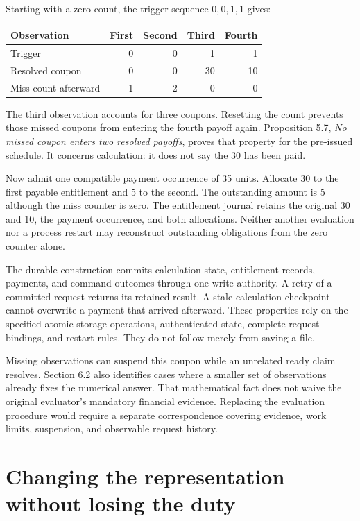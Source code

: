 \documentclass{momentum}
\begin{document}
Starting with a zero count, the trigger sequence $0,0,1,1$ gives:

\begin{center}
\begin{tabular}{@{}lrrrr@{}}
\toprule
Observation & First & Second & Third & Fourth \\
\midrule
Trigger & 0 & 0 & 1 & 1 \\
Resolved coupon & 0 & 0 & 30 & 10 \\
Miss count afterward & 1 & 2 & 0 & 0 \\
\bottomrule
\end{tabular}
\end{center}

The third observation accounts for three coupons. Resetting the count prevents those missed coupons from entering the fourth payoff again. Proposition 5.7, \emph{No missed coupon enters two resolved payoffs}, proves that property for the pre-issued schedule. It concerns calculation: it does not say the 30 has been paid.

Now admit one compatible payment occurrence of 35 units. Allocate 30 to the first payable entitlement and 5 to the second. The outstanding amount is 5 although the miss counter is zero. The entitlement journal retains the original 30 and 10, the payment occurrence, and both allocations. Neither another evaluation nor a process restart may reconstruct outstanding obligations from the zero counter alone.

The durable construction commits calculation state, entitlement records, payments, and command outcomes through one write authority. A retry of a committed request returns its retained result. A stale calculation checkpoint cannot overwrite a payment that arrived afterward. These properties rely on the specified atomic storage operations, authenticated state, complete request bindings, and restart rules. They do not follow merely from saving a file.

Missing observations can suspend this coupon while an unrelated ready claim resolves. Section 6.2 also identifies cases where a smaller set of observations already fixes the numerical answer. That mathematical fact does not waive the original evaluator's mandatory financial evidence. Replacing the evaluation procedure would require a separate correspondence covering evidence, work limits, suspension, and observable request history.

\section{Changing the representation without losing the duty}
\label{sec:carriage}
\end{document}
